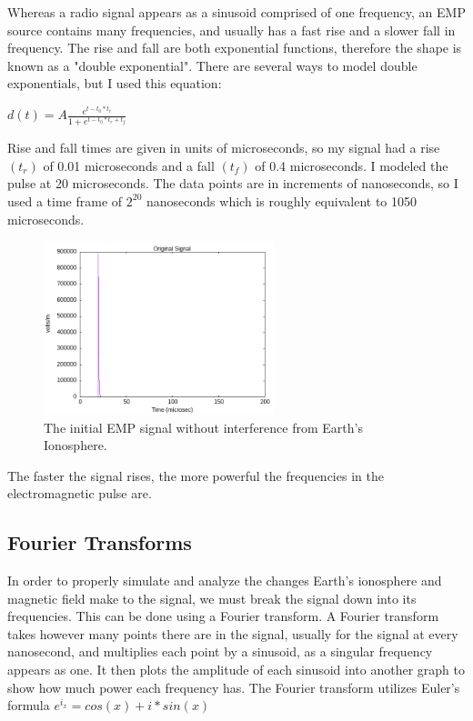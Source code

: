 \documentclass[12pt, reqno]{amsart}
\begin{document}
\noindent Whereas a radio signal appears as a sinusoid comprised of one frequency,
an EMP source contains many frequencies,  and usually has a fast rise and a slower fall in frequency. The rise and fall are both exponential functions, therefore the shape is known as a "double exponential". There are several ways to model double exponentials, but I used this equation:

\begin{center}
    $d(t)=A\frac{e^{t-t_0*t_r}}{1 + e^{t-t_0*t_r + t_f}}$
\end{center}

\noindent Rise and fall times are given in units of microseconds, so my signal had a rise $(t_r)$ of 0.01 microseconds and a fall $(t_f)$ of 0.4 microseconds. I modeled the pulse at 20 microseconds. The data points are in increments of nanoseconds, so I used a time frame of $2^{20}$ nanoseconds
which is roughly equivalent to 1050 microseconds.

\begin{figure}[h]
    \centering
    \includegraphics[width= 0.6\textwidth]{emp_original_signal.png}
    \caption{\small The initial EMP signal without interference from Earth's Ionosphere.}
    \label{fig:test-08}
\end{figure}

The faster the signal rises, the more powerful the frequencies in the electromagnetic pulse are.

\subsection{Fourier Transforms}
In order to properly simulate and analyze the changes Earth's ionosphere and magnetic field make to the signal, we must break the signal down into its frequencies. This can be done using a Fourier transform. A Fourier transform takes however many points there are in the signal, usually for the signal at every nanosecond, and multiplies each point by a sinusoid, as a singular frequency appears as one. It then plots the amplitude of each sinusoid into another graph to show how much power each frequency has. The Fourier transform utilizes Euler's formula $e^{i_x} = cos(x) + i*sin(x)$
\end{document}
